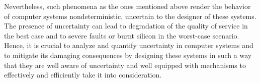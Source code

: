 Nevertheless, such phenomena as the ones mentioned above render the behavior of
computer systems nondeterministic, uncertain to the designer of these systems.
The presence of uncertainty can lead to degradation of the quality of service in
the best case and to severe faults or burnt silicon in the worst-case scenario.
Hence, it is crucial to analyze and quantify uncertainty in computer systems and
to mitigate its damaging consequences by designing these systems in such a way
that they are well aware of uncertainty and well equipped with mechanisms to
effectively and efficiently take it into consideration.
